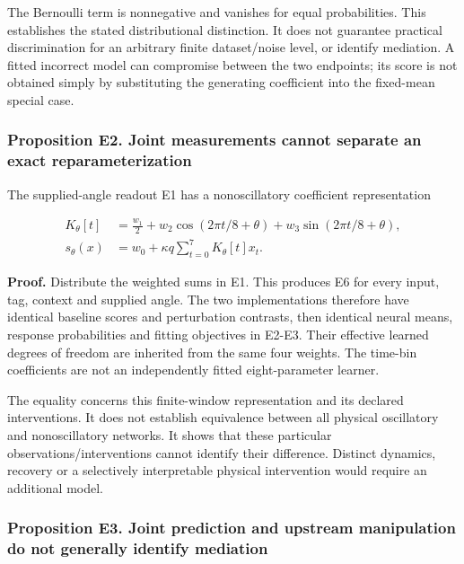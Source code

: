 \documentclass[
  american,
  11pt,
  letterpaper,
]{article}
\begin{document}
The Bernoulli term is nonnegative and vanishes for equal probabilities. This establishes the stated distributional distinction. It does not guarantee practical discrimination for an arbitrary finite dataset/noise level, or identify mediation. A fitted incorrect model can compromise between the two endpoints; its score is not obtained simply by substituting the generating coefficient into the fixed-mean special case.

\subsubsection{Proposition E2. Joint measurements cannot separate an exact reparameterization}\label{proposition-e2.-joint-measurements-cannot-separate-an-exact-reparameterization}

The supplied-angle readout E1 has a nonoscillatory coefficient representation

\[
\begin{aligned}
K_\theta[t]&=\frac{w_1}{2}+w_2\cos(2\pi t/8+\theta)
                              +w_3\sin(2\pi t/8+\theta),\\
s_\theta(x)&=w_0+\kappa q\sum_{t=0}^{7}K_\theta[t]x_t.
\end{aligned}\tag{E6}
\]

\textbf{Proof.} Distribute the weighted sums in E1. This produces E6 for every input, tag, context and supplied angle. The two implementations therefore have identical baseline scores and perturbation contrasts, then identical neural means, response probabilities and fitting objectives in E2-E3. Their effective learned degrees of freedom are inherited from the same four weights. The time-bin coefficients are not an independently fitted eight-parameter learner.

The equality concerns this finite-window representation and its declared interventions. It does not establish equivalence between all physical oscillatory and nonoscillatory networks. It shows that these particular observations/interventions cannot identify their difference. Distinct dynamics, recovery or a selectively interpretable physical intervention would require an additional model.

\subsubsection{Proposition E3. Joint prediction and upstream manipulation do not generally identify mediation}\label{proposition-e3.-joint-prediction-and-upstream-manipulation-do-not-generally-identify-mediation}
\end{document}

